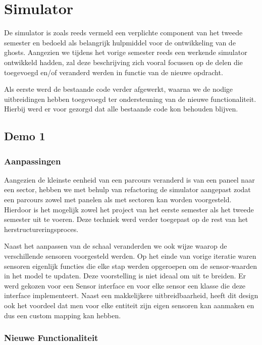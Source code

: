 \documentclass[12pt,a4paper]{report}
\begin{document}
\chapter{Simulator}

De simulator is zoals reeds vermeld een verplichte component van het tweede semester en bedoeld als belangrijk hulpmiddel voor de ontwikkeling van de ghosts. Aangezien we tijdens het vorige semester reeds een werkende simulator ontwikkeld hadden, zal deze beschrijving zich vooral focussen op de delen die toegevoegd en/of veranderd werden in functie van de nieuwe opdracht.

Als eerste werd de bestaande code verder afgewerkt, waarna we de nodige uitbreidingen hebben toegevoegd ter ondersteuning van de nieuwe functionaliteit. Hierbij werd er voor gezorgd dat alle bestaande code kon behouden blijven.

\section{Demo 1}

\subsection{Aanpassingen}

Aangezien de kleinste eenheid van een parcours veranderd is van een paneel naar een sector, hebben we met behulp van refactoring de simulator aangepast zodat een parcours zowel met panelen als met sectoren kan worden voorgesteld. Hierdoor is het mogelijk zowel het project van het eerste semester als het tweede semester uit te voeren. Deze techniek werd verder toegepast op de rest van het herstructureringsproces. 

Naast het aanpassen van de schaal veranderden we ook wijze waarop de verschillende sensoren voorgesteld werden. Op het einde van vorige iteratie waren sensoren eigenlijk functies die elke stap werden opgeroepen om de sensor-waarden in het model te updaten. Deze voorstelling is niet ideaal om uit te breiden. Er werd gekozen voor een Sensor interface en voor elke sensor een klasse die deze interface implementeert. Naast een makkelijkere uitbreidbaarheid, heeft dit design ook het voordeel dat men voor elke entiteit zijn eigen sensoren kan aanmaken en dus een custom mapping kan hebben.

\subsection{Nieuwe Functionaliteit}
\end{document}
